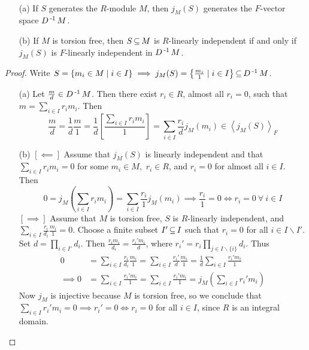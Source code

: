 \documentclass[11pt]{book}
\theoremstyle{definition}   \newtheorem{defn}[counter]{Definition} %
\newcommand{\bs}{\backslash}   \newcommand{\A}{\mathcal{A}}   \newcommand{\sy}{\textnormal{Syl}}   \newcommand{\size}[1]{\left| #1 \right|}
\newcommand{\gen}[1]{\left\langle #1 \right\rangle}   \newcommand{\stab}[2]{\tn{Stab}_{#1}(#2)}   \newcommand{\fix}[2]{\tn{Fix}_{#1}(#2)}   \newcommand{\op}{^{\tn{op}}}
\numberwithin{counter}{chapter}
\begin{document}
\begin{lemma}\
\begin{enumerate}
\item[(a)] If $S$ generates the $R$-module $M$, then $j_M(S)$ generates the $F$-vector space $D\operatorname{^{-1}} M$.
\item[(b)] If $M$ is torsion free, then $S \operatorname{\subseteq} M$ is $R$-linearly independent if and only if $j_M(S)$ is $F$-linearly independent in $D\operatorname{^{-1}} M$.
\end{enumerate}
\end{lemma}

\begin{proof} Write $S = \{m_i \in M \mid i \in I\} \implies j_M(S) = \left\{ \frac{m_i}{1} \mid i \in I \right\} \operatorname{\subseteq} D\operatorname{^{-1}} M$.
\begin{enumerate}
\item[(a)] Let $\frac{m}{d} \in D\operatorname{^{-1}} M$. Then there exist $r_i \in R$, almost all $r_i = 0$, such that $m = \sum_{i \in I} r_i m_i$. Then
	\[\frac{m}{d} = \frac{1}{d} \frac{m}{1} = \frac{1}{d} \left[\frac{\sum_{i \in I} r_i m_i}{1}\right] = \sum_{i \in I} \frac{r_i}{d} j_M(m_i) \in \gen{j_M(S)}_F \]
\item[(b)] $[\impliedby]$ Assume that $j_M(S)$ is linearly independent and that $\sum_{i \in I} r_i m_i = 0$ for some $m_i \in M,$ $r_i \in R$, and $r_i = 0$ for almost all $i \in I$. Then
	\[0 = j_M \left(\sum_{i \in I} r_i m_i\right) = \sum_{i \in I} \frac{r_i}{1} j_M(m_i) \implies \frac{r_i}{1} = 0 \iff r_i = 0 \ \forall \ i \in I \]
$[\implies]$ Assume that $M$ is torsion free, $S$ is $R$-linearly independent, and $\sum_{i \in I} \frac{r_i}{d_i} \frac{m_i}{1} = 0$. Choose a finite subset $I' \operatorname{\subseteq} I$ such that $r_i = 0$ for all $i \in I \bs I'$. Set $d = \prod_{i \in I'} d_i$. Then $\frac{r_i m_i}{d_i} = \frac{r_i' m_i}{d}$, where $r_i' = r_i \prod_{j \in I \bs \{i\}} d_i$. Thus
\begin{align*}
0 &= \sum_{i \in I} \frac{r_i}{d_i} \frac{m_i}{1} = \sum_{i \in I} \frac{r_i'}{d} \frac{m_i}{1} = \frac{1}{d} \sum_{i \in I} \frac{r_i' m_i}{1} \\
\implies 0 &= \sum_{i \in I} \frac{r_i' m_i}{1} = \sum_{i \in I} \frac{r_i' m_i}{1} = j_M\left(\sum_{i \in I} r_i' m_i\right)
\end{align*}
Now $j_M$ is injective because $M$ is torsion free, so we conclude that $\sum_{i \in I} r_i' m_i = 0 \implies r_i' = 0 \iff r_i = 0$ for all $i \in I$, since $R$ is an integral domain.
\end{enumerate}
\end{proof}
\end{document}
